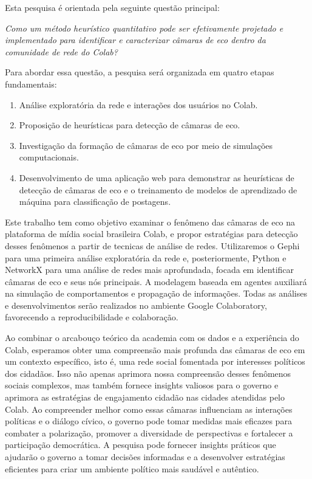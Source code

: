 Esta pesquisa é orientada pela seguinte questão principal:

\textit{
	Como um método heurístico quantitativo pode ser efetivamente projetado e implementado para identificar e caracterizar câmaras de eco dentro da comunidade de rede do Colab?
}

Para abordar essa questão, a pesquisa será organizada em quatro etapas fundamentais:

\begin{enumerate}
	\item Análise exploratória da rede e interações dos usuários no Colab.
	\item Proposição de heurísticas para detecção de câmaras de eco.
	\item Investigação da formação de câmaras de eco por meio de simulações computacionais.
	\item Desenvolvimento de uma aplicação web para demonstrar as heurísticas de detecção de câmaras de eco e o treinamento de modelos de aprendizado de máquina para classificação de postagens.
\end{enumerate}

Este trabalho tem como objetivo examinar o fenômeno das câmaras de eco na plataforma de mídia social brasileira Colab, e propor estratégias para detecção desses fenômenos a partir de tecnicas de análise de redes. Utilizaremos o Gephi para uma primeira análise exploratória da rede e, posteriormente, Python e NetworkX para uma análise de redes mais aprofundada, focada em identificar câmaras de eco e seus nós principais. A modelagem baseada em agentes auxiliará na simulação de comportamentos e propagação de informações. Todas as análises e desenvolvimentos serão realizados no ambiente Google Colaboratory, favorecendo a reproducibilidade e colaboração.

Ao combinar o arcabouço teórico da academia com os dados e a experiência do Colab, esperamos obter uma compreensão mais profunda das câmaras de eco em um contexto específico, isto é, uma rede social fomentada por interesses políticos dos cidadãos. Isso não apenas aprimora nossa compreensão desses fenômenos sociais complexos, mas também fornece insights valiosos para o governo e aprimora as estratégias de engajamento cidadão nas cidades atendidas pelo Colab. Ao compreender melhor como essas câmaras influenciam as interações políticas e o diálogo cívico, o governo pode tomar medidas mais eficazes para combater a polarização, promover a diversidade de perspectivas e fortalecer a participação democrática. A pesquisa pode fornecer insights práticos que ajudarão o governo a tomar decisões informadas e a desenvolver estratégias eficientes para criar um ambiente político mais saudável e autêntico.

